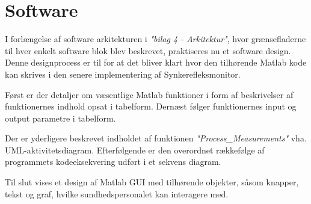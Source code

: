 \chapter{Software}
I forlængelse af software arkitekturen i \textit{"bilag 4 - Arkitektur"}, hvor grænsefladerne til hver enkelt software blok blev beskrevet,  praktiseres nu et software design. Denne designprocess er til for at det bliver klart hvor den tilhørende Matlab kode kan skrives i den senere implementering af Synkerefleksmonitor.

Først er der detaljer om væsentlige Matlab funktioner i form af beskrivelser af funktionernes indhold opsat i tabelform. Dernæst følger funktionernes input og output parametre i tabelform.

Der er yderligere beskrevet indholdet af funktionen \textit{"Process\_Measurements"} vha. UML-aktivitetsdiagram. Efterfølgende er den overordnet rækkefølge af programmets kodeeksekvering udført i et sekvens diagram.

Til slut vises et design af Matlab GUI med tilhørende objekter, såsom knapper, tekst og graf, hvilke sundhedspersonalet kan interagere med. 


